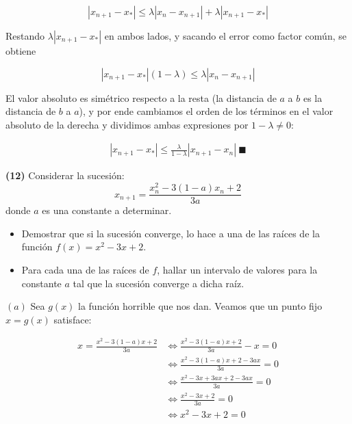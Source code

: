 \documentclass[12pt]{article}
\begin{document}
\begin{equation*}
    \left| x_{n+1} - x_* \right| \leq \lambda \left| x_n - x_{n+1} \right| +
    \lambda \left| x_{n+1} - x_* \right| 
\end{equation*}

Restando $\lambda \left| x_{n+1} - x_* \right| $ en ambos lados, y sacando el
error como factor común, se obtiene 

\begin{equation*}
    \left| x_{n+1} - x_* \right| \left( 1 - \lambda \right) \leq \lambda \left|
    x_n - x_{n+1}\right| 
\end{equation*}

El valor absoluto es simétrico respecto a la resta (la distancia de $a$ a $b$ es
la distancia de $b$ a $a$), y por ende cambiamos el orden de los términos en el
valor absoluto de la derecha y dividimos ambas expresiones por $1 - \lambda \neq
0$:

\begin{align*}
    \left| x_{n+1} - x_*\right|  \leq \frac{\lambda}{1 - \lambda}\left| x_{n+1}
    - x_n\right|  ~ \blacksquare
\end{align*}

\pagebreak 

\begin{myframe}
    \textbf{(12)} Considerar la sucesión:
\[
x_{n+1} = \frac{x_n^2 - 3(1 - a)x_n + 2}{3a}
\]
donde $a$ es una constante a determinar.

\begin{itemize}
    \item[a)] Demostrar que si la sucesión converge, lo hace a una de las raíces de la función $f(x) = x^2 - 3x + 2$.
    \item[b)] Para cada una de las raíces de $f$, hallar un intervalo de valores para la constante $a$ tal que la sucesión converge a dicha raíz.
\end{itemize}
\end{myframe}

$(a)$ Sea $g(x)$ la función horrible que nos dan. Veamos que un punto fijo $x =
g(x)$ satisface:

\begin{align*}
    x = \frac{x^2 - 3(1 - a)x + 2}{3a} 
    &\iff 
    \frac{x^2 - 3(1 - a)x + 2}{3a} - x = 0 \\ 
    &\iff 
    \frac{x^2 - 3(1 - a)x + 2 - 3ax}{3a} = 0 \\
    &\iff 
    \frac{x^2 - 3x + 3ax + 2 -3ax}{3a} = 0 \\ 
    &\iff 
    \frac{x^2 -3x + 2}{3a} = 0 \\ 
    &\iff 
    x^2 -3x + 2 = 0
\end{align*}
\end{document}
